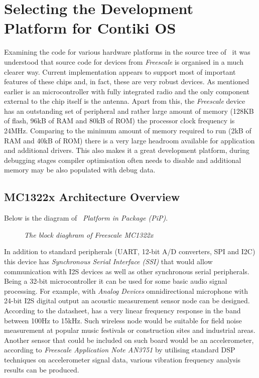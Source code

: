 \section{Selecting the Development Platform for Contiki OS}

  Examining the code for various hardware platforms in the source
 tree of \ContikiOS\, it was understood that source code for
  devices from \emph{Freescale} is organised in a
 much clearer way. Current implementation appears to support most
 of important features of these chips and, in fact, these are
 very robust devices. As mentioned earlier  is an
  microcontroller with fully integrated radio and
 the only component external to the chip itself is the antenna.
 Apart from this, the \emph{Freescale} device has an outstanding
 set of peripheral and rather large amount of memory (128KB of
 flash, 96kB of RAM and 80kB of ROM) the processor clock frequency
 is 24MHz. Comparing to the minimum amount of memory required
 to run \Contiki (2kB of RAM and 40kB of ROM) there is a very
 large headroom available for application and additional drivers.
 This also makes it a great development platform, during debugging
 stages compiler optimisation often needs to disable and additional
 memory may be also populated with debug data.

\subsection{MC1322x Architecture Overview}

 Below is the diagram of \MCX\ \emph{Platform in Package (PiP)}.

\begin{figure}
\caption{\emph{The block diaghram of Freescale MC1322x}}
\end{figure}

  In addition to standard peripherals (UART, 12-bit A/D converters,
 SPI and I2C) this device has \emph{Synchronous Serial Interface (SSI)}
 that would allow communication with I2S devices as well as other
 synchronous serial peripherals. Being a 32-bit microcontroller
 it can be used for some basic audio signal processing. For example,
 with \emph{Analog Devices}  omnidirectional microphone
 with 24-bit I2S digital output \cite{datasheet:adi:admp441} an
 acoustic measurement sensor node can be designed. According to the
 datasheet,  has a very linear frequency response in
 the band between 100Hz to 15kHz. Such wireless node would be
 suitable for field noise measurement at popular music festivals
 or construction sites and industrial areas.
 Another sensor that could be included on such board would be an
 accelerometer, according to \emph{Freescale Application
 Note AN3751} \cite{appnote:freescale:AN3751} by utilising standard
 DSP techniques on accelerometer signal data, various vibration
 frequency analysis results can be produced.


